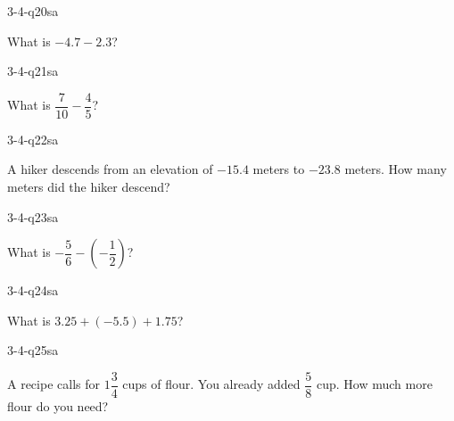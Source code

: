 \begin{practiceQuestion}{3-4-q20}{sa}
\begin{questionText}
What is $-4.7 - 2.3$?
\end{questionText}
\end{practiceQuestion}

\begin{practiceQuestion}{3-4-q21}{sa}
\begin{questionText}
What is $\dfrac{7}{10} - \dfrac{4}{5}$?
\end{questionText}
\end{practiceQuestion}

\begin{practiceQuestion}{3-4-q22}{sa}
\begin{questionText}
A hiker descends from an elevation of $-15.4$ meters to $-23.8$ meters. How many meters did the hiker descend?
\end{questionText}
\end{practiceQuestion}

\begin{practiceQuestion}{3-4-q23}{sa}
\begin{questionText}
What is $-\dfrac{5}{6} - \left(-\dfrac{1}{2}\right)$?
\end{questionText}
\end{practiceQuestion}

\begin{practiceQuestion}{3-4-q24}{sa}
\begin{questionText}
What is $3.25 + (-5.5) + 1.75$?
\end{questionText}
\end{practiceQuestion}

\begin{practiceQuestion}{3-4-q25}{sa}
\begin{questionText}
A recipe calls for $1\dfrac{3}{4}$ cups of flour. You already added $\dfrac{5}{8}$ cup. How much more flour do you need?
\end{questionText}
\end{practiceQuestion}

